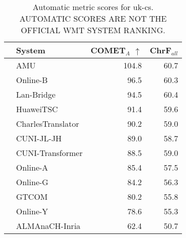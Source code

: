 \begin{table}
\centering
\caption{Automatic metric scores for uk-cs. \\AUTOMATIC SCORES ARE NOT THE OFFICIAL WMT SYSTEM RANKING.}
\begin{tabular}{llrr}
\toprule
          &             System &  COMET$_{A}$ $\uparrow$ &  ChrF$_{all}$ \\
\midrule
 \Const{} &                AMU &                   104.8 &          60.7 \\
 \Uncon{} &           Online-B &                    96.5 &          60.3 \\
 \Uncon{} &         Lan-Bridge &                    94.5 &          60.4 \\
 \Const{} &          HuaweiTSC &                    91.4 &          59.6 \\
 \Uncon{} &  CharlesTranslator &                    90.2 &          59.0 \\
 \Const{} &         CUNI-JL-JH &                    89.0 &          58.7 \\
 \Const{} &   CUNI-Transformer &                    88.5 &          59.0 \\
 \Uncon{} &           Online-A &                    85.4 &          57.5 \\
 \Uncon{} &           Online-G &                    84.2 &          56.3 \\
 \Uncon{} &              GTCOM &                    80.2 &          55.8 \\
 \Uncon{} &           Online-Y &                    78.6 &          55.3 \\
 \Const{} &     ALMAnaCH-Inria &                    62.4 &          50.7 \\
\bottomrule
\end{tabular}
\end{table}



